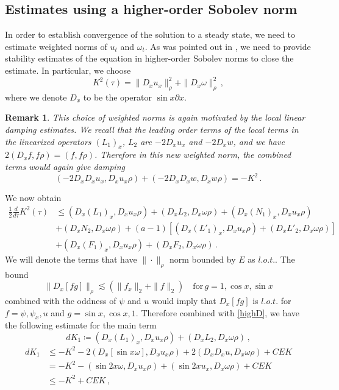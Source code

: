 \documentclass[12pt]{caltech_thesis}
\newtheorem{remark}[theorem]{Remark}
\numberwithin{equation}{section}
\begin{document}
\subsection{Estimates using a higher-order Sobolev norm}
\label{h2sec}
In order to establish convergence of the solution to a steady state, we need to estimate weighted norms of $u_t$ and $\omega_t$. As was pointed out in \cite{chen2021slightly}, we need to provide stability estimates of the equation in higher-order Sobolev norms to close the estimate. In particular, we choose $$K^2(\tau)=\|D_xu_x\|_{\rho}^2+\|D_x\omega\|_{\rho}^2\,,$$
where we denote $D_x$ to be the operator $\sin x\partial x$.

\begin{remark}
This choice of weighted  norms is again motivated by the local linear damping estimates. We recall that the leading order terms of the local terms in the linearized operators $(L_1)_x$, $L_2$ are $-2D_xu_x$ and $-2D_xw$, and we have $2(D_x f,f\rho)=(f,f\rho)$. Therefore in this new weighted norm, the combined terms would again give damping \begin{equation}\label{highD}
    (-2D_x D_x u_x,D_x u_x\rho)+(-2D_xD_x w,D_x w\rho)=-K^2\,.
\end{equation}
\end{remark}
We now obtain
$$\begin{aligned}\frac{1}{2}\frac{d}{d\tau}K^2(\tau)&\leq (D_x(L_1)_x,D_xu_x\rho)+(D_xL_2,D_x\omega\rho)+(D_x(N_1)_x,D_xu_x\rho)\\&+(D_xN_2,D_x\omega\rho)+(a-1)[(D_x(L'_1)_x,D_xu_x\rho)+(D_xL'_2,D_x\omega\rho)]\\&+(D_x(F_1)_x,D_xu_x\rho)+(D_xF_2,D_x\omega\rho)\,.\end{aligned}$$
We will denote the terms that have $\|\cdot\|_{\rho}$ norm bounded by $E$ as $\textit{l.o.t.}$. The bound
$$\|D_x[fg]\|_{\rho}\lesssim (\|f_x\|_{2}+\|f\|_{2})\quad \text{for}\, g=1,\cos x,\sin x$$
combined with the oddness of $\psi$ and $u$ would imply that $D_x[fg]$ is $\textit{l.o.t.}$ for $f=\psi,\psi_x,u$ and $g=\sin x,\cos x,1$.
Therefore combined with \eqref{highD}, we have the following estimate for the main term $$dK_1\coloneqq(D_x(L_1)_x,D_xu_x\rho)+(D_xL_2,D_x\omega\rho)\,,$$ $$\begin{aligned}dK_1&\leq -K^2-2(D_x[\sin x \omega],D_xu_x\rho)+2(D_xD_xu,D_x\omega\rho)+CEK\\&=-K^2-(\sin 2x\omega,D_xu_x\rho)+(\sin 2x u_x,D_x\omega\rho)+CEK\\&\leq-K^2+CEK\,,\end{aligned}$$
\end{document}
